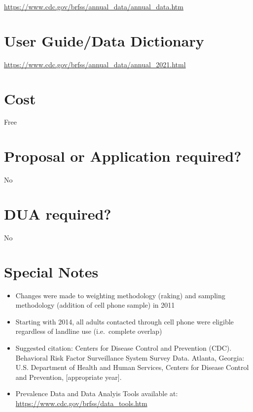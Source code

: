 \documentclass[
]{book}
\providecommand{\tightlist}{%
  \setlength{\itemsep}{0pt}\setlength{\parskip}{0pt}}
\begin{document}
\url{https://www.cdc.gov/brfss/annual_data/annual_data.htm}

\hypertarget{user-guidedata-dictionary-11}{%
\section{User Guide/Data Dictionary}\label{user-guidedata-dictionary-11}}

\url{https://www.cdc.gov/brfss/annual_data/annual_2021.html}

\hypertarget{cost-11}{%
\section{Cost}\label{cost-11}}

Free

\hypertarget{proposal-or-application-required-11}{%
\section{Proposal or Application required?}\label{proposal-or-application-required-11}}

No

\hypertarget{dua-required-11}{%
\section{DUA required?}\label{dua-required-11}}

No

\hypertarget{special-notes-11}{%
\section{Special Notes}\label{special-notes-11}}

\begin{itemize}
\tightlist
\item
  Changes were made to weighting methodology (raking) and sampling methodology (addition of cell phone sample) in 2011
\item
  Starting with 2014, all adults contacted through cell phone were eligible regardless of landline use (i.e.~complete overlap)
\item
  Suggested citation: Centers for Disease Control and Prevention (CDC). Behavioral Risk Factor Surveillance System Survey Data. Atlanta, Georgia: U.S. Department of Health and Human Services, Centers for Disease Control and Prevention, {[}appropriate year{]}.
\item
  Prevalence Data and Data Analyis Tools available at: \url{https://www.cdc.gov/brfss/data_tools.htm}
\end{itemize}
\end{document}
